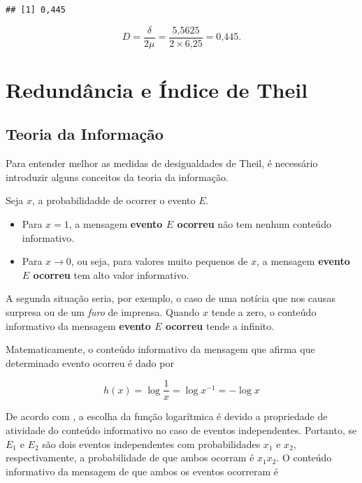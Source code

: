 \documentclass[
]{book}
\begin{document}
\begin{verbatim}
## [1] 0,445
\end{verbatim}

\[
  D = \dfrac{\delta}{2\mu} = \dfrac{\text{5,5625}}{2 \times \text{6,25}} = \text{0,445}.
\]

\hypertarget{redunduxe2ncia-e-uxedndice-de-theil}{%
\section{Redundância e Índice de Theil}\label{redunduxe2ncia-e-uxedndice-de-theil}}

\hypertarget{teoria-da-informauxe7uxe3o}{%
\subsection{Teoria da Informação}\label{teoria-da-informauxe7uxe3o}}

Para entender melhor as medidas de desigualdades de Theil, é necessário introduzir alguns conceitos da teoria da informação.

Seja \(x\), a probabilidadde de ocorrer o evento \(E\).

\begin{itemize}
\item
  Para \(x=1\), a mensagem \textbf{evento \(E\) ocorreu} não tem nenhum conteúdo informativo.
\item
  Para \(x \rightarrow 0\), ou seja, para valores muito pequenos de \(x\), a mensagem \textbf{evento \(E\) ocorreu} tem alto valor informativo.
\end{itemize}

A segunda situação seria, por exemplo, o caso de uma notícia que nos causas surpresa ou de um \emph{furo} de imprensa. Quando \(x\) tende a zero, o conteúdo informativo da mensagem \textbf{evento \(E\) ocorreu} tende a infinito.

Matematicamente, o conteúdo informativo da mensagem que afirma que determinado evento ocorreu é dado por

\[
  h(x) = \log \dfrac{1}{x} = \log x^{-1} = - \log x
  \label{eq:ConteudoInformativo}
\]

De acordo com \citet{Hoffmann2006}, a escolha da função logarítmica é devido a propriedade de atividade do conteúdo informativo no caso de eventos independentes. Portanto, se \(E_1\) e \(E_2\) são dois eventos independentes com probabilidades \(x_1\) e \(x_2\), respectivamente, a probabilidade de que ambos ocorram é \(x_1x_2\). O conteúdo informativo da mensagem de que ambos os eventos ocorreram é
\end{document}
